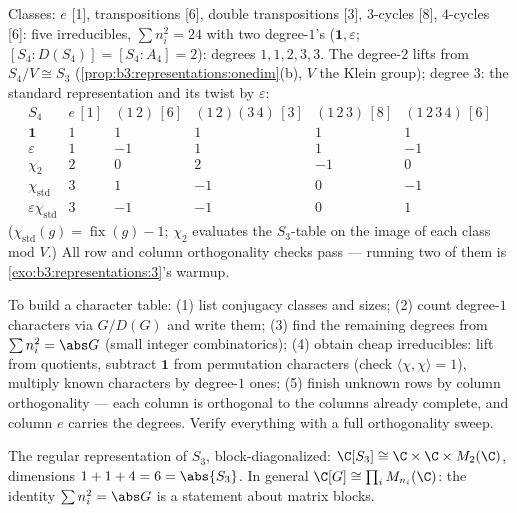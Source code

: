 \begin{example}\label{ex:b3:representations:s4}
Classes: $e$ [1], transpositions [6], double transpositions [3],
$3$-cycles [8], $4$-cycles [6]: five irreducibles, $\sum n_i^2 =
24$ with two degree-$1$'s ($\mathbf 1, \varepsilon$; $[S_4 :
D(S_4)] = [S_4 : A_4] = 2$): degrees $1, 1, 2, 3, 3$. The
degree-$2$ lifts from $S_4/V \cong S_3$
(\cref{prop:b3:representations:onedim}(b), $V$ the Klein group);
degree $3$: the standard representation and its twist by
$\varepsilon$:
\[
\begin{array}{c|ccccc}
S_4 & e\,[1] & (1\,2)\,[6] & (1\,2)(3\,4)\,[3] &
(1\,2\,3)\,[8] & (1\,2\,3\,4)\,[6]\\
\hline
\mathbf 1 & 1 & 1 & 1 & 1 & 1\\
\varepsilon & 1 & -1 & 1 & 1 & -1\\
\chi_2 & 2 & 0 & 2 & -1 & 0\\
\chi_{\mathrm{std}} & 3 & 1 & -1 & 0 & -1\\
\varepsilon\chi_{\mathrm{std}} & 3 & -1 & -1 & 0 & 1
\end{array}
\]
($\chi_{\mathrm{std}}(g) = \operatorname{fix}(g) - 1$;
$\chi_2$ evaluates the $S_3$-table on the image of each class
mod $V$.) All row and column orthogonality checks pass ---
running two of them is \cref{exo:b3:representations:3}'s warmup.
\end{example}

\begin{method}\label{met:b3:representations:table}
To build a character table: (1) list conjugacy classes and sizes;
(2) count degree-$1$ characters via $G/D(G)$ and write them; (3)
find the remaining degrees from $\sum n_i^2 = \abs G$ (small
integer combinatorics); (4) obtain cheap irreducibles: lift from
quotients, subtract $\mathbf 1$ from permutation characters
(check $\langle\chi,\chi\rangle = 1$), multiply known characters
by degree-$1$ ones; (5) finish unknown rows by column
orthogonality --- each column is orthogonal to the columns
already complete, and column $e$ carries the degrees. Verify
everything with a full orthogonality sweep.
\end{method}

\begin{omfigure}

{\small The regular representation of $S_3$, block-diagonalized:
$\C[S_3] \cong \C \times \C \times M_2(\C)$, dimensions $1 + 1 +
4 = 6 = \abs{S_3}$. In general $\C[G] \cong \prod_i
M_{n_i}(\C)$: the identity $\sum n_i^2 = \abs G$ is a statement
about matrix blocks.}
\end{omfigure}

